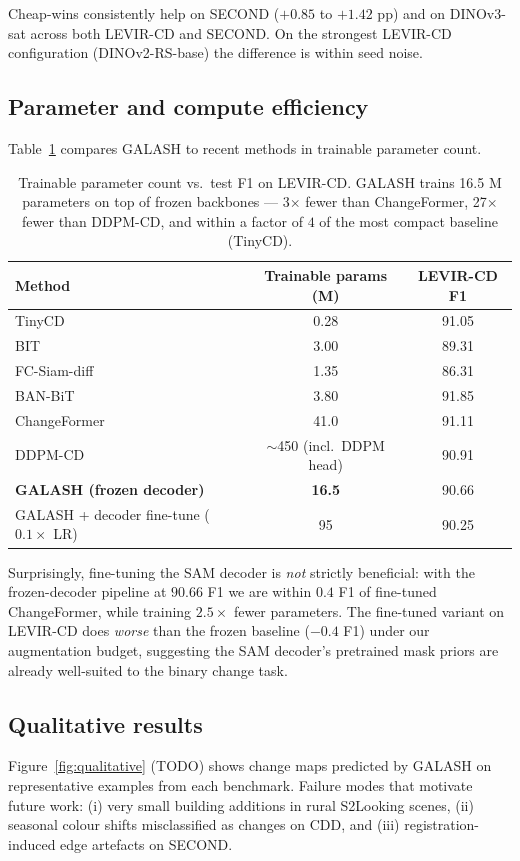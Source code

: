Cheap-wins consistently help on SECOND ($+0.85$ to $+1.42$ pp) and on
DINOv3-sat across both LEVIR-CD and SECOND. On the strongest LEVIR-CD
configuration (DINOv2-RS-base) the difference is within seed noise.

\subsection{Parameter and compute efficiency}

Table~\ref{tab:params} compares GALASH to recent methods in trainable
parameter count.

\begin{table}[h]
  \centering
  \small
  \caption{Trainable parameter count vs.\ test F1 on LEVIR-CD.
    GALASH trains 16.5 M parameters on top of frozen backbones --- 3$\times$
    fewer than ChangeFormer, 27$\times$ fewer than DDPM-CD, and within a
    factor of $4$ of the most compact baseline (TinyCD).}
  \label{tab:params}
  \begin{tabular}{lcc}
    \toprule
    Method & Trainable params (M) & LEVIR-CD F1 \\
    \midrule
    TinyCD~\citep{codegoni2023tinycd}            & 0.28 & 91.05 \\
    BIT~\citep{chen2021remote}                   & 3.00 & 89.31 \\
    FC-Siam-diff~\citep{daudt2018fully}          & 1.35 & 86.31 \\
    BAN-BiT~\citep{li2024ban}                    & 3.80 & 91.85 \\
    ChangeFormer~\citep{bandara2022changeformer} & 41.0 & 91.11 \\
    DDPM-CD~\citep{bandara2024ddpmcd}            & $\sim$450 (incl.\ DDPM head) & 90.91 \\
    \midrule
    \textbf{GALASH (frozen decoder)}             & \textbf{16.5} & 90.66 \\
    GALASH + decoder fine-tune ($0.1\times$ LR)  & 95            & 90.25 \\
    \bottomrule
  \end{tabular}
\end{table}

Surprisingly, fine-tuning the SAM decoder is \emph{not} strictly
beneficial: with the frozen-decoder pipeline at $90.66$ F1 we are within
$0.4$ F1 of fine-tuned ChangeFormer, while training $2.5\times$ fewer
parameters. The fine-tuned variant on LEVIR-CD does \emph{worse} than the
frozen baseline ($-0.4$ F1) under our augmentation budget, suggesting
the SAM decoder's pretrained mask priors are already well-suited to the
binary change task.

\subsection{Qualitative results}

Figure~\ref{fig:qualitative} (TODO) shows change maps predicted by GALASH
on representative examples from each benchmark. Failure modes that motivate
future work: (i) very small building additions in rural S2Looking scenes,
(ii) seasonal colour shifts misclassified as changes on CDD, and (iii)
registration-induced edge artefacts on SECOND.
